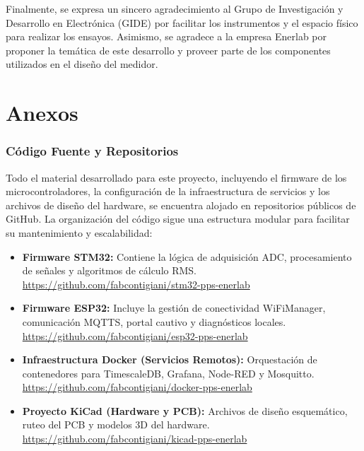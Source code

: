 \documentclass[12pt, a4paper]{article} %
\begin{document}
Finalmente, se expresa un sincero agradecimiento al Grupo de Investigación y Desarrollo en Electrónica (GIDE) por facilitar los instrumentos y el espacio físico para realizar los ensayos. Asimismo, se agradece a la empresa Enerlab por proponer la temática de este desarrollo y proveer parte de los componentes utilizados en el diseño del medidor.

\printbibliography[heading=bibnumbered,title=Bibliografía]

\clearpage
\vspace*{0cm}
\part*{Anexos}

\appendix

\section{Código Fuente y Repositorios}

Todo el material desarrollado para este proyecto, incluyendo el firmware de los microcontroladores, la configuración de la infraestructura de servicios y los archivos de diseño del hardware, se encuentra alojado en repositorios públicos de GitHub. La organización del código sigue una estructura modular para facilitar su mantenimiento y escalabilidad:

\begin{itemize}
  \item \textbf{Firmware STM32:} Contiene la lógica de adquisición ADC, procesamiento de señales y algoritmos de cálculo RMS. \\ \url{https://github.com/fabcontigiani/stm32-pps-enerlab}

  \item \textbf{Firmware ESP32:} Incluye la gestión de conectividad WiFiManager, comunicación MQTTS, portal cautivo y diagnósticos locales. \\ \url{https://github.com/fabcontigiani/esp32-pps-enerlab}

  \item \textbf{Infraestructura Docker (Servicios Remotos):} Orquestación de contenedores para TimescaleDB, Grafana, Node-RED y Mosquitto. \\ \url{https://github.com/fabcontigiani/docker-pps-enerlab}

  \item \textbf{Proyecto KiCad (Hardware y PCB):} Archivos de diseño esquemático, ruteo del PCB y modelos 3D del hardware. \\ \url{https://github.com/fabcontigiani/kicad-pps-enerlab}
\end{itemize}
\end{document}
